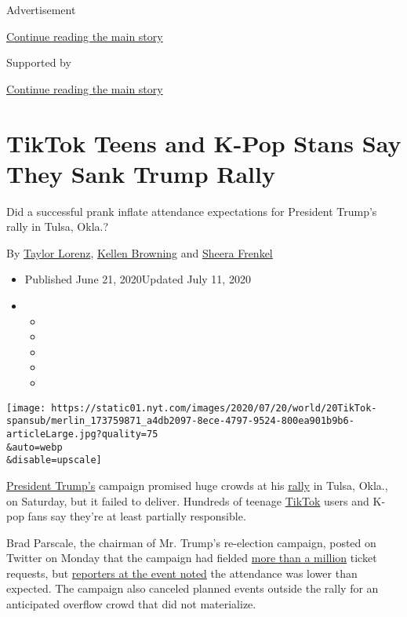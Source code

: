 Advertisement

\protect\hyperlink{after-top}{Continue reading the main story}

Supported by

\protect\hyperlink{after-sponsor}{Continue reading the main story}

\hypertarget{tiktok-teens-and-k-pop-stans-say-they-sank-trump-rally}{%
\section{TikTok Teens and K-Pop Stans Say They Sank Trump
Rally}\label{tiktok-teens-and-k-pop-stans-say-they-sank-trump-rally}}

Did a successful prank inflate attendance expectations for President
Trump's rally in Tulsa, Okla.?

By \href{https://www.nytimes.com/by/taylor-lorenz}{Taylor Lorenz},
\href{https://www.nytimes.com/by/kellen-browning}{Kellen Browning} and
\href{https://www.nytimes.com/by/sheera-frenkel}{Sheera Frenkel}

\begin{itemize}
\item
  Published June 21, 2020Updated July 11, 2020
\item
  \begin{itemize}
  \item
  \item
  \item
  \item
  \item
  \end{itemize}
\end{itemize}

\texttt{[image: https://static01.nyt.com/images/2020/07/20/world/20TikTok-spansub/merlin\_173759871\_a4db2097-8ece-4797-9524-800ea901b9b6-articleLarge.jpg?quality=75\\\&auto=webp\\\&disable=upscale]}

\href{https://www.nytimes.com/2020/06/22/style/trump-tulsa-tie.html}{President
Trump's} campaign promised huge crowds at his
\href{https://www.nytimes.com/2020/07/08/us/politics/trump-rally-portsmouth-new-hampshire.html}{rally}
in Tulsa, Okla., on Saturday, but it failed to deliver. Hundreds of
teenage
\href{https://www.nytimes.com/2020/08/03/technology/trump-tiktok-microsoft.html}{TikTok}
users and K-pop fans say they're at least partially responsible.

Brad Parscale, the chairman of Mr. Trump's re-election campaign, posted
on Twitter on Monday that the campaign had fielded
\href{https://twitter.com/parscale/status/1272543199647666176?s=20}{more
than a million} ticket requests, but
\href{https://twitter.com/AsteadWesley/status/1274465912951844866?s=20}{reporters
at the event noted} the attendance was lower than expected. The campaign
also canceled planned events outside the rally for an anticipated
overflow crowd that did not materialize.

